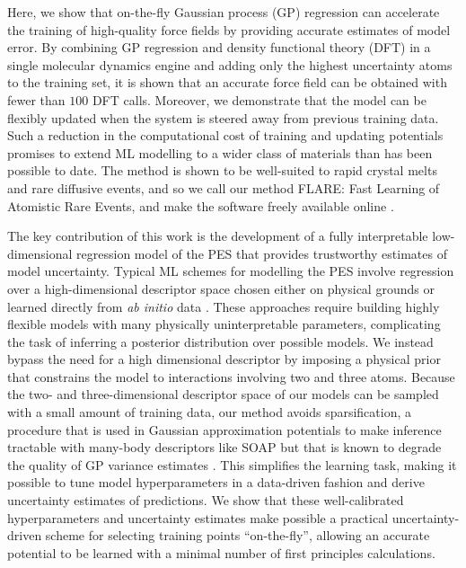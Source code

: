 \documentclass[%
reprint,
superscriptaddress,
amsmath,amssymb,
aps,
prl,
]{revtex4-1}
\begin{document}
Here, we show that on-the-fly Gaussian process (GP) regression can accelerate the training of high-quality force fields by providing accurate estimates of model error. By combining GP regression and density functional theory (DFT) in a single molecular dynamics engine and adding only the highest uncertainty atoms to the training set, it is shown that an accurate force field can be obtained with fewer than $100$ DFT calls. Moreover, we demonstrate that the model can be flexibly updated when the system is steered away from previous training data. Such a reduction in the computational cost of training and updating potentials promises to extend ML modelling to a wider class of materials than has been possible to date. The method is shown to be well-suited to rapid crystal melts and rare diffusive events, and so we call our method FLARE: Fast Learning of Atomistic Rare Events, and make the software freely available online \cite{flare}.

The key contribution of this work is the development of a fully interpretable low-dimensional regression model of the PES that provides trustworthy estimates of model uncertainty. Typical ML schemes for modelling the PES involve regression over a high-dimensional descriptor space chosen either on physical grounds \cite{behler2011atom, bartok2013representing} or learned directly from \textit{ab initio} data \cite{schutt2017schnet, zhang2018end}. These approaches require building highly flexible models with many physically uninterpretable parameters, complicating the task of inferring a posterior distribution over possible models. We instead bypass the need for a high dimensional descriptor by imposing a physical prior that constrains the model to interactions involving two and three atoms. Because the two- and three-dimensional descriptor space of our models can be sampled with a small amount of training data, our method avoids sparsification, a procedure that is used in Gaussian approximation potentials to make inference tractable with many-body descriptors like SOAP \cite{bartok2010gaussian, bartok2013representing, bartok2015gaussian} but that is known to degrade the quality of GP variance estimates \cite{rasmussen2003gaussian}. This simplifies the learning task, making it possible to tune model hyperparameters in a data-driven fashion and derive uncertainty estimates of predictions. We show that these well-calibrated hyperparameters and uncertainty estimates make possible a practical uncertainty-driven scheme for selecting training points ``on-the-fly'', allowing an accurate potential to be learned with a minimal number of first principles calculations.
\end{document}
